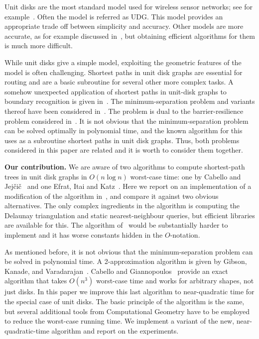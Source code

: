 \documentclass[a4paper,USenglish]{lipics}
\def\myparagraph#1{\medskip\noindent\textbf{#1.}}
\begin{document}
Unit disks are the most standard model used for wireless sensor networks; 
see for example~\cite{GG11,HS95,zg-wsn-04}. 
Often the model is referred as UDG.
This model provides an appropriate trade off between simplicity and accuracy. 
Other models are more accurate, as for example discussed in~\cite{KWZ03,LP10},
but obtaining efficient algorithms for them is much more difficult.

While unit disks give a simple model, exploiting the geometric features 
of the model is often challenging. 
Shortest paths in unit disk graphs are essential for routing and
are a basic subroutine for several other more complex tasks. 
A somehow unexpected application of shortest paths in unit-disk graphs
to boundary recognition is given in~\cite{WGM06}.
The minimum-separation problem and variants thereof have been considered 
in~\cite{CG16,gkv-ipud-11,pv-2013}. 
The problem is dual to the barrier-resilience problem considered in~\cite{BK09,KH07,KLA05,KLA07}.
It is not obvious that the minimum-separation problem can be solved optimally
in polynomial time, and the known algorithm for this uses as a subroutine 
shortest paths in unit disk graphs. 
Thus, both problems considered in this paper are related and it is worth to 
consider them together.


\myparagraph{Our contribution}
We are aware of two algorithms to compute shortest-path trees in unit disk graphs in
$O(n\log n)$ worst-case time: one by Cabello and Jej\v{c}i\v{c}~\cite{CJ15} and one Efrat, Itai and Katz~\cite{eik-01}. 
Here we report on an implementation of a modification of the algorithm in~\cite{CJ15},
and compare it against two obvious alternatives.
The only complex ingredients in the algorithm is computing the Delaunay triangulation
and static nearest-neighbour queries,
but efficient libraries are available for this.
The algorithm of~\cite{eik-01} would be substantially harder to implement 
and it has worse constants hidden in the $O$-notation. 

As mentioned before, it is not obvious that the minimum-separation problem 
can be solved in polynomial time. 
A 2-approximation algorithm is given by Gibson, Kanade, and Varadarajan~\cite{gkv-ipud-11}. 
Cabello and Giannopoulos~\cite{CG16} provide an exact algorithm that takes $O(n^3)$ 
worst-case time and works for arbitrary shapes, not just disks. 
In this paper we improve this last algorithm to near-quadratic time for the 
special case of unit disks. 
The basic principle of the algorithm is the same, but several additional tools
from Computational Geometry have to be employed to reduce the worst-case running time. 
We implement a variant of the new, near-quadratic-time algorithm and report
on the experiments.
\end{document}

